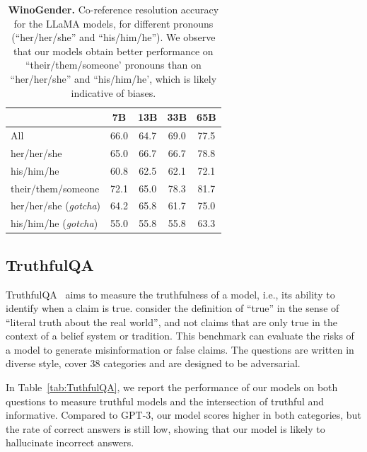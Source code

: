 \documentclass[11pt]{article}
\newcommand{\model}{LLaMA\xspace}
\begin{document}
\begin{table}[t]
\center
\begin{tabular}{l cccc}
  \toprule  
  & 7B & 13B & 33B & 65B \\
  \midrule
  All    & 66.0 & 64.7 & 69.0 & 77.5 \\
  \midrule
  her/her/she    & 65.0 & 66.7 & 66.7 & 78.8 \\
  his/him/he    & 60.8 & 62.5 & 62.1 & 72.1 \\
  their/them/someone  & 72.1 & 65.0 & 78.3 & 81.7 \\
  \midrule
  her/her/she (\emph{gotcha}) & 64.2 & 65.8 & 61.7 & 75.0 \\
  his/him/he (\emph{gotcha}) & 55.0 & 55.8 & 55.8 & 63.3 \\
  \bottomrule
  \end{tabular}
   \caption{
    \textbf{WinoGender.} Co-reference resolution accuracy for the \model models, for different pronouns (``her/her/she'' and ``his/him/he'').
    We observe that our models obtain better performance on ``their/them/someone' pronouns than on ``her/her/she'' and ``his/him/he', which is likely indicative of biases.}
    \label{tab:winogender}
\end{table}

\subsection{TruthfulQA}

TruthfulQA~\citep{lin2021truthfulqa} aims to measure the truthfulness of a model, i.e., its ability to identify when a claim is true.
\citet{lin2021truthfulqa} consider the definition of ``true'' in the sense of ``literal truth about the real world'', and not claims that are only true in the context of a belief system or tradition.
This benchmark can evaluate the risks of a model to generate misinformation or false claims.
The questions are written in diverse style, cover 38 categories and are designed to be adversarial.

In Table~\ref{tab:TuthfulQA}, we report the performance of our models on both questions to measure truthful models and the intersection of truthful and informative. 
Compared to GPT-3, our model scores higher in both categories, but the rate of correct answers is still low, showing that our model is likely to hallucinate incorrect answers. 
\end{document}
